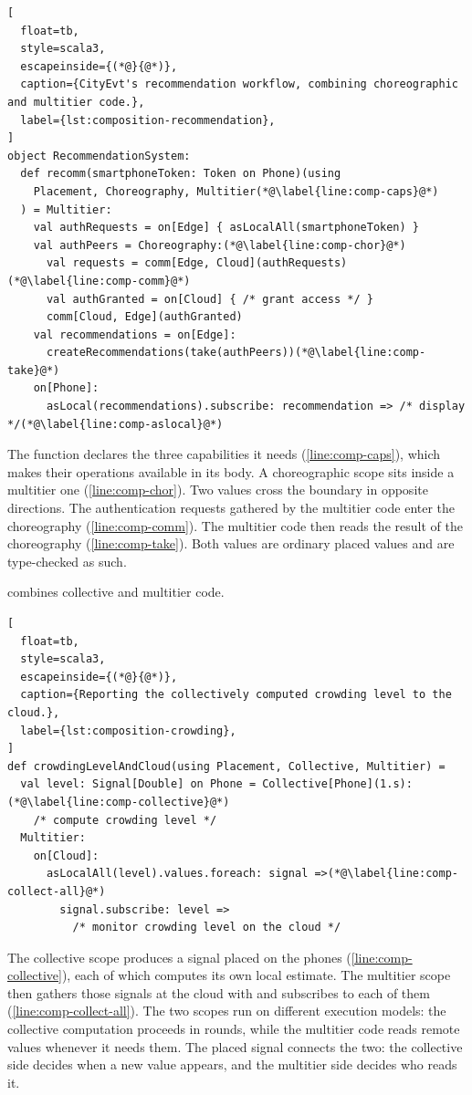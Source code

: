 \begin{lstlisting}[
  float=tb,
  style=scala3,
  escapeinside={(*@}{@*)},
  caption={CityEvt's recommendation workflow, combining choreographic and multitier code.},
  label={lst:composition-recommendation},
]
object RecommendationSystem:
  def recomm(smartphoneToken: Token on Phone)(using
    Placement, Choreography, Multitier(*@\label{line:comp-caps}@*)
  ) = Multitier:
    val authRequests = on[Edge] { asLocalAll(smartphoneToken) }
    val authPeers = Choreography:(*@\label{line:comp-chor}@*)
      val requests = comm[Edge, Cloud](authRequests)(*@\label{line:comp-comm}@*)
      val authGranted = on[Cloud] { /* grant access */ }
      comm[Cloud, Edge](authGranted)
    val recommendations = on[Edge]:
      createRecommendations(take(authPeers))(*@\label{line:comp-take}@*)
    on[Phone]:
      asLocal(recommendations).subscribe: recommendation => /* display */(*@\label{line:comp-aslocal}@*)
\end{lstlisting}

The function declares the three capabilities it needs (\cref{line:comp-caps}), which makes their operations available in its body.
%
A choreographic scope sits inside a multitier one (\cref{line:comp-chor}).
%
Two values cross the boundary in opposite directions.
The authentication requests gathered by the multitier code enter the choreography (\cref{line:comp-comm}).
The multitier code then reads the result of the choreography (\cref{line:comp-take}).
%
Both values are ordinary placed values and are type-checked as such.

 combines collective and multitier code.

\begin{lstlisting}[
  float=tb,
  style=scala3,
  escapeinside={(*@}{@*)},
  caption={Reporting the collectively computed crowding level to the cloud.},
  label={lst:composition-crowding},
]
def crowdingLevelAndCloud(using Placement, Collective, Multitier) =
  val level: Signal[Double] on Phone = Collective[Phone](1.s):(*@\label{line:comp-collective}@*)
    /* compute crowding level */
  Multitier:
    on[Cloud]:
      asLocalAll(level).values.foreach: signal =>(*@\label{line:comp-collect-all}@*)
        signal.subscribe: level =>
          /* monitor crowding level on the cloud */
\end{lstlisting}

The collective scope produces a signal placed on the phones (\cref{line:comp-collective}),
each of which computes its own local estimate.
%
The multitier scope then gathers those signals at the cloud with  and subscribes to each of them (\cref{line:comp-collect-all}).
%
The two scopes run on different execution models:
the collective computation proceeds in rounds, while the multitier code reads remote values whenever it needs them.
%
The placed signal connects the two:
the collective side decides when a new value appears, and the multitier side decides who reads it.

